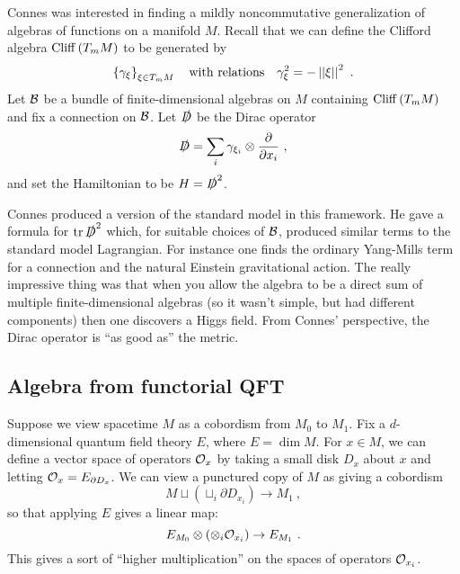 Connes was interested in finding a mildly noncommutative generalization of algebras of
functions on a manifold $M$.
Recall that we can define the Clifford algebra $\operatorname{Cliff}\left(T_m M\right)$ to be generated
by 
\begin{equation*}
\left\{\gamma_\xi\right\}_{\xi\in T_m M} 
\quad\text{with relations}\quad
\gamma_\xi^2 = -\left|\left|{\xi}\right|\right|^2 \ .
\end{equation*}
Let $\mathcal{B}$ be a bundle of finite-dimensional algebras on $M$ containing 
$\operatorname{Cliff}\left(T_m M\right)$ and fix a connection on $\mathcal{B}$.
Let $\slashed{D}$ be the Dirac operator
\begin{equation*}
\slashed{D} = \sum_i \gamma_{\xi_i} \otimes \frac{\partial}{\partial x_i} \ ,
\end{equation*}
and set the Hamiltonian to be $H = \slashed{D}^2$.

Connes produced a version of the standard model in this framework.
He gave a formula for $\operatorname{tr} \slashed{D}^2$ which, for suitable choices of $\mathcal{B}$, 
produced similar terms to the standard model Lagrangian.
For instance one finds the ordinary Yang-Mills term for a connection and 
the natural Einstein gravitational action.
The really impressive thing was that when you allow the algebra to be a direct sum of
multiple finite-dimensional algebras (so it wasn't simple, but had different components)
then one discovers a Higgs field.
From Connes' perspective, the Dirac operator is ``as good as'' the metric.

\subsection{Algebra from functorial QFT}

Suppose we view spacetime $M$ as a cobordism from $M_0$ to $M_1$.
Fix a $d$-dimensional quantum field theory $E$, where $E = \dim M$.
For $x \in M$, we can define a vector space of operators $\mathcal{O}_x$ by taking a small disk
$D_x$ about $x$ and letting $\mathcal{O}_x = E_{\partial D_x}$.
We can view a punctured copy of $M$ as giving a cobordism 
\begin{equation*}
M \sqcup \left(\sqcup_i \partial D_{x_i} \right) \to M_1 \ ,
\end{equation*}
so that applying $E$ gives a linear map:
\begin{equation*}
E_{M_0} \otimes \left(\otimes_i \mathcal{O}_{x_i}\right) \to E_{M_1} \ .
\end{equation*}
This gives a sort of ``higher multiplication'' on the spaces of operators $\mathcal{O}_{x_i}$.

